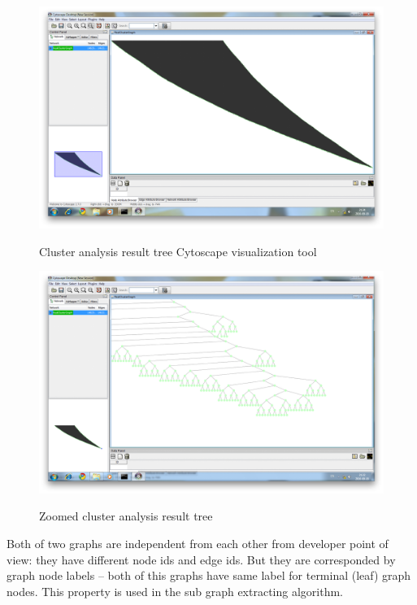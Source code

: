 \documentclass[a4paper,oneside]{article}
\begin{document}
\begin{figure}[h]
\begin{center}
	\includegraphics[scale=0.3]{Cytoscape_cluster_graph_1.png}
	\label{Cytoscape_Cluster_1}
	\caption{Cluster analysis result tree Cytoscape visualization tool}
\end{center}
\end{figure}

\begin{figure}[h]
\begin{center}
	\includegraphics[scale=0.3]{Cytoscape_cluster_graph_2.png}
	\label{Cytoscape_Cluster_2}
	\caption{Zoomed cluster analysis result tree}
\end{center}
\end{figure}

Both of two graphs are independent from each other from developer point of view: they have different node ids and edge ids. But they are corresponded by graph node labels -- both of this graphs have same label for terminal (leaf) graph nodes. This property is used in the sub graph extracting algorithm.
\end{document}
